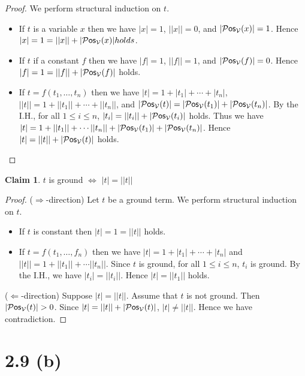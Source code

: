 \documentclass[autodetect-enginem]{article}
\newcommand{\VV}{\mathcal{V}}
\theoremstyle{plain}
\theoremstyle{definition}
\theoremstyle{definition}
\newtheorem*{claim}{Claim}
\begin{document}
\begin{proof}
    We perform structural induction on $t$.
    \begin{itemize}
        \item If $t$ is a variable $x$ then we have $|x| = 1$, $||x|| = 0$, and $|\Pos_\VV(x)| = 1$.
            Hence $|x| = 1 = ||x|| + |\Pos_\VV(x)| holds$.
        \item If $t$ if a constant $f$ then we have $|f| = 1$, $||f|| = 1$, and $|\Pos_\VV(f)| = 0$.
            Hence $|f| = 1 = ||f|| + |\Pos_\VV(f)|$ holds.
        \item If $t = f(t_1,\dots,t_n)$ then we have $|t| = 1 + |t_1| + \cdots + |t_n|$,
            $||t|| = 1 + ||t_1|| + \cdots + ||t_n||$, and $|\Pos_\VV(t)| = |\Pos_\VV(t_1)| + |\Pos_\VV(t_n)|$.
            By the I.H., for all $1 \leq i \leq n$, $|t_i| = ||t_i|| + |\Pos_\VV(t_i)|$ holds.
            Thus we have $|t| = 1 + ||t_1|| + \cdots ||t_n|| + |\Pos_\VV(t_1)| + |\Pos_\VV(t_n)|$.
            Hence $|t| = ||t|| +|\Pos_\VV(t)|$ holds. 
    \end{itemize}
\end{proof}

\begin{claim}
    $t$ is ground $\Leftrightarrow$ $|t| = ||t||$
\end{claim}

\begin{proof}
    ($\Rightarrow$-direction) Let $t$ be a ground term.
    We perform structural induction on $t$.
    \begin{itemize}
        \item If $t$ is constant then $|t| = 1 = ||t||$ holds.
        \item If $t = f(t_1,\dots,f_n)$ then we have $|t| = 1 + |t_1| + \cdots + |t_n|$ and $||t|| = 1 + ||t_1|| + \cdots||t_n||$.
        Since $t$ is ground, for all $1 \leq i \leq n$, $t_i$ is ground.
        By the I.H., we have $|t_i| = ||t_i||$.
        Hence $|t| = ||t_1||$ holds.
    \end{itemize}

    ($\Leftarrow$-direction)
    Suppose $|t| = ||t||$.
    Assume that $t$ is not ground.
    Then $|\Pos_\VV(t)| > 0$.
    Since $|t| = ||t|| + |\Pos_\VV(t)|$, $|t| \neq ||t||$.
    Hence we have contradiction.
\end{proof}



\section*{2.9 (b)}
\end{document}

